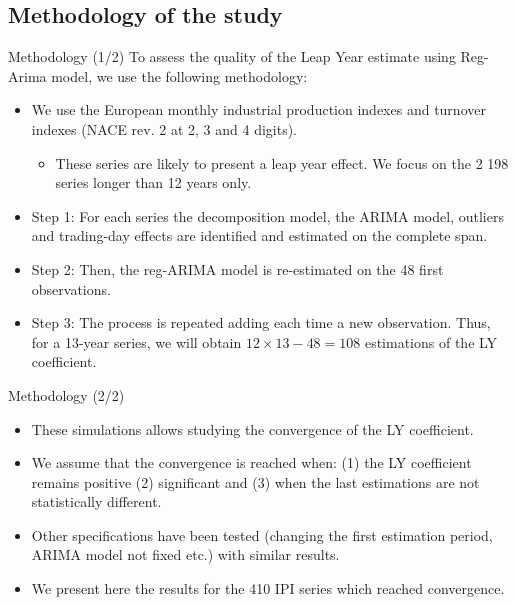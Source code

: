 \documentclass[10pt, handout]{beamer}
\begin{document}
\subsection{Methodology of the study}
\begin{frame}{Methodology (1/2)}
To assess the quality of the Leap Year estimate using Reg-Arima model, we use the following methodology:
\begin{itemize}
	\item We use the European monthly industrial production indexes and turnover indexes (NACE rev. 2 at 2, 3 and 4 digits).
		\begin{itemize}
		  \item These series are likely to present a leap year effect. We focus on the 2 198 series longer than 12 years only.
	  \end{itemize}
	\item Step 1: For each series the decomposition model, the ARIMA model, outliers and trading-day effects are identified and estimated on the complete span.
	\item<2-> Step 2: Then, the reg-ARIMA model is re-estimated on the 48 first observations.
	\item<2-> Step 3: The process is repeated adding each time a new observation. Thus, for a 13-year series, we will obtain $12 \times 13 - 48 = 108$ estimations of the LY coefficient.
\end{itemize}
\end{frame}

\begin{frame}{Methodology (2/2)}
\begin{itemize}
	\item These simulations allows studying the convergence of the LY coefficient.
	\item We assume that the convergence is reached when: (1) the LY coefficient remains positive (2) significant and (3) when the last estimations are not statistically different.
	\item Other specifications have been tested (changing the first estimation period, ARIMA model not fixed etc.) with similar results.
	\item We present here the results for the 410 IPI series which reached convergence.
\end{itemize}
\end{frame}
\end{document}
